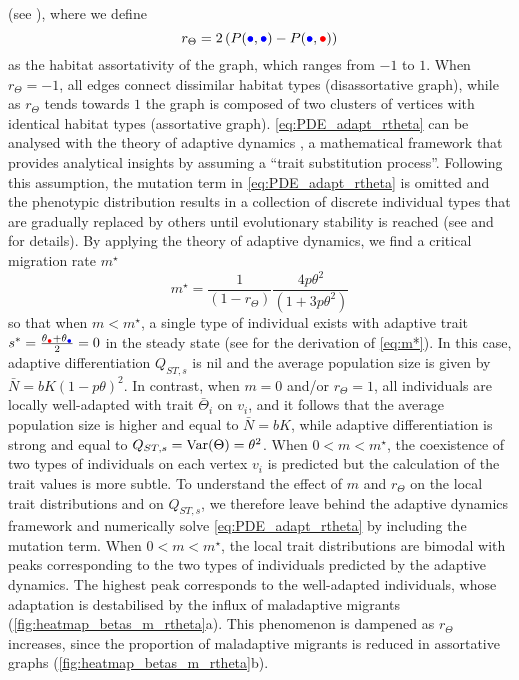   (see ), where we define
  \begin{equation}\label{eq:r_theta_mf}
	r_\Theta = 2 \left( P({\bcirc},{\bcirc}) - P({\bcirc},{\rcirc}) \right)
  \end{equation} 
  as the habitat assortativity of the graph, which ranges from $-1$ to $1$.
  When $r_\Theta = -1$, all edges connect dissimilar habitat types (disassortative graph), while as $r_\Theta$ tends towards $1$ the graph is composed of two clusters of vertices with identical habitat types (assortative graph).
  \cref{eq:PDE_adapt_rtheta} can be analysed with the theory of adaptive dynamics \cite{Meszena1997,Debarre2013,Mirrahimi2020}, a mathematical framework that provides analytical insights by assuming a “trait substitution process”. Following this assumption, the mutation term in \cref{eq:PDE_adapt_rtheta} is omitted and the phenotypic distribution results in a collection of discrete individual types that are gradually replaced by others until evolutionary stability is reached (see  and \cite{Meszena1997,Debarre2013,Mirrahimi2020} for details). By applying the theory of adaptive dynamics, we find a critical migration rate $m^\star$
  \begin{equation}\label{eq:m*}
	  m^\star = \frac{1}{(1-r_\Theta)}\frac{4 p \theta^2}{(1 + 3 p \theta^2)}
  \end{equation}
  so that when $m < m^\star$, a single type of individual exists with adaptive trait $s^* = \frac{\theta_{\rcirc} + \theta_{\bcirc}}{2} = 0$ in the steady state (see  for the derivation of \cref{eq:m*}). In this case, adaptive differentiation $Q_{ST,s}$ is nil and the average population size is given by $\bar{N} = bK(1-p\theta)^2$.
  In contrast, when $m=0$ and/or $r_\Theta = 1$, all individuals are locally well-adapted with trait $\bar\Theta_i$ on $v_i$, and it follows that the average population size is higher and equal to $\bar{N} = bK$, while adaptive differentiation is strong and equal to $Q_{ST,s} = \mbox{Var}(\Theta) = \theta^2$. 
  When $0 < m < m^\star$, the coexistence of two types of individuals on each vertex $v_i$ is predicted but the calculation of the trait values is more subtle.
  To understand the effect of $m$ and $r_\Theta$ on the local trait distributions and on $Q_{ST,s}$, we therefore leave behind the adaptive dynamics framework and numerically solve \cref{eq:PDE_adapt_rtheta} by including the mutation term. When $0 < m < m^\star$, the local trait distributions are bimodal with peaks corresponding to the two types of individuals predicted by the adaptive dynamics. The highest peak corresponds to the well-adapted individuals, whose adaptation is destabilised by the influx of maladaptive migrants (\cref{fig:heatmap_betas_m_rtheta}a). This phenomenon is dampened as $r_\Theta$ increases, since the proportion of maladaptive migrants is reduced in assortative graphs (\cref{fig:heatmap_betas_m_rtheta}b).
